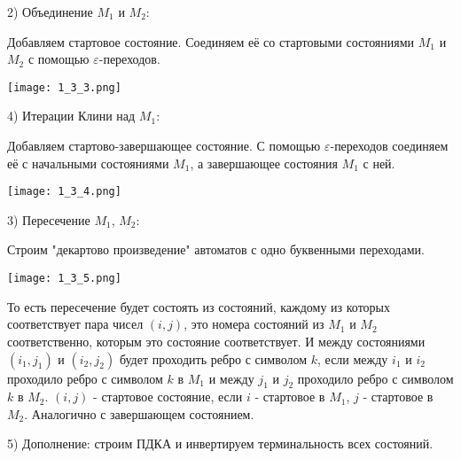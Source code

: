 2) Объединение $M_1$ и $M_2$:

Добавляем стартовое состояние. Соединяем её со стартовыми состояниями $M_1$ и $M_2$ с помощью $\varepsilon$-переходов. 
\begin{center}
\texttt{[image: 1\_3\_3.png]}
\end{center}

4) Итерации Клини над $M_1$:

Добавляем стартово-завершающее состояние. С помощью $\varepsilon$-переходов соединяем её с начальными состояниями $M_1$, а завершающее состояния $M_1$ с ней.
\begin{center}
\texttt{[image: 1\_3\_4.png]}
\end{center}

3) Пересечение $M_1$, $M_2$:

Строим "декартово произведение" автоматов с одно буквенными переходами.

\begin{center}
\texttt{[image: 1\_3\_5.png]}
\end{center}

То есть пересечение будет состоять из состояний, каждому из которых соответствует пара чисел $(i, j)$, это номера состояний из $M_1$ и $M_2$ соответственно, которым это состояние соответствует. И между состояниями $(i_1, j_1)$ и $(i_2, j_2)$ будет проходить ребро с символом $k$, если между $i_1$ и $i_2$ проходило ребро с символом $k$ в $M_1$ и между $j_1$ и $j_2$ проходило ребро с символом $k$ в $M_2$. $(i, j)$ - стартовое состояние, если $i$ - стартовое в $M_1$, $j$ - стартовое в $M_2$. Аналогично с завершающем состоянием. 

5) Дополнение: строим ПДКА и инвертируем терминальность всех состояний.
